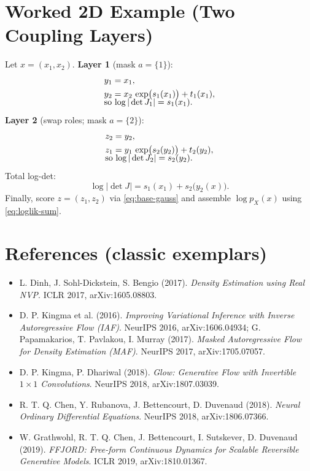 \documentclass[11pt]{article}
\theoremstyle{remark}
\begin{document}
\section{Worked 2D Example (Two Coupling Layers)}
Let $x=(x_1,x_2)$. \textbf{Layer 1} (mask $a{=}\{1\}$):
\begin{align}
y_1 &= x_1, \\
y_2 &= x_2\, \exp\!\big(s_1(x_1)\big) + t_1(x_1),
\\[-0.75em]
\intertext{so $\displaystyle \log|\det J_1| = s_1(x_1)$.}
\end{align}
\textbf{Layer 2} (swap roles; mask $a{=}\{2\}$):
\begin{align}
z_2 &= y_2, \\
z_1 &= y_1\, \exp\!\big(s_2(y_2)\big) + t_2(y_2),
\\[-0.75em]
\intertext{so $\displaystyle \log|\det J_2| = s_2(y_2)$.}
\end{align}
Total log-det:
\begin{equation}
\log|\det J| = s_1(x_1) + s_2\!\big(y_2(x)\big).
\label{eq:2d-total-logdet}
\end{equation}
Finally, score $z=(z_1,z_2)$ via \eqref{eq:base-gauss} and assemble $\log p_X(x)$ using \eqref{eq:loglik-sum}.

\section*{References (classic exemplars)}
\begin{itemize}[leftmargin=1.5em]
\item L. Dinh, J. Sohl-Dickstein, S. Bengio (2017). \emph{Density Estimation using Real NVP}. ICLR 2017, arXiv:1605.08803.
\item D. P. Kingma et al. (2016). \emph{Improving Variational Inference with Inverse Autoregressive Flow (IAF)}. NeurIPS 2016, arXiv:1606.04934; G. Papamakarios, T. Pavlakou, I. Murray (2017). \emph{Masked Autoregressive Flow for Density Estimation (MAF)}. NeurIPS 2017, arXiv:1705.07057.
\item D. P. Kingma, P. Dhariwal (2018). \emph{Glow: Generative Flow with Invertible $1\times1$ Convolutions}. NeurIPS 2018, arXiv:1807.03039.
\item R. T. Q. Chen, Y. Rubanova, J. Bettencourt, D. Duvenaud (2018). \emph{Neural Ordinary Differential Equations}. NeurIPS 2018, arXiv:1806.07366.
\item W. Grathwohl, R. T. Q. Chen, J. Bettencourt, I. Sutskever, D. Duvenaud (2019). \emph{FFJORD: Free-form Continuous Dynamics for Scalable Reversible Generative Models}. ICLR 2019, arXiv:1810.01367.
\end{itemize}
\end{document}

